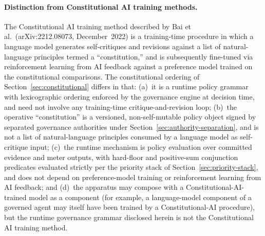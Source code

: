 \documentclass[a4paper,12pt]{article}
\begin{document}
\paragraph{Distinction from Constitutional AI training methods.}
The Constitutional AI training method described by Bai et al.\
(arXiv:2212.08073, December~2022) is a training-time procedure in
which a language model generates self-critiques and revisions
against a list of natural-language principles termed a
``constitution,'' and is subsequently fine-tuned via reinforcement
learning from AI feedback against a preference model trained on
the constitutional comparisons. The constitutional ordering of
Section~\ref{sec:constitutional} differs in that: (a)~it is a
runtime policy grammar with lexicographic ordering enforced by the
governance engine at decision time, and need not involve any
training-time critique-and-revision loop; (b)~the operative
``constitution'' is a versioned, non-self-mutable policy object
signed by separated governance authorities under
Section~\ref{sec:authority-separation}, and is not a list of
natural-language principles consumed by a language model as
self-critique input; (c)~the runtime mechanism is policy
evaluation over committed evidence and meter outputs, with
hard-floor and positive-sum conjunction predicates evaluated
strictly per the priority stack of
Section~\ref{sec:priority-stack}, and does not depend on
preference-model training or reinforcement learning from AI
feedback; and (d)~the apparatus may compose with a
Constitutional-AI-trained model as a component (for example, a
language-model component of a governed agent may itself have
been trained by a Constitutional-AI procedure), but the runtime
governance grammar disclosed herein is not the Constitutional AI
training method.
\end{document}
